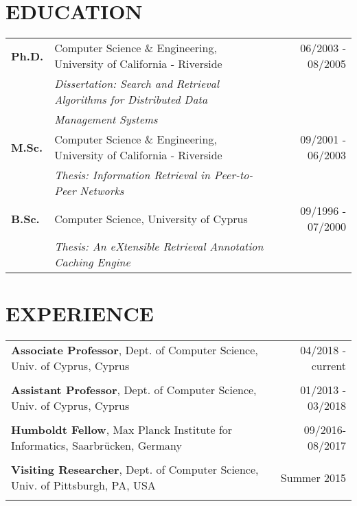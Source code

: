 \documentclass[10pt]{article}
\begin{document}
\begin{samepage}
\section{\bf EDUCATION}
\begin{center}  %
\begin{tabular*}{1.0\textwidth}%
   {@{\extracolsep{\fill}}llr}
{\bf Ph.D.}	& 	Computer Science \& Engineering, University of California - Riverside 		&       06/2003 - 08/2005 \\
		& 	{\em Dissertation: Search and Retrieval Algorithms for Distributed Data}		&			\\
        &  {\em Management Systems}  & \\
{\bf M.Sc.}	& 	Computer Science \& Engineering, University of California - Riverside 		& 	 09/2001 - 06/2003	\\
		& 	{\em Thesis: Information Retrieval in Peer-to-Peer Networks}	 		&			\\
{\bf B.Sc.}	& 	Computer Science, University of Cyprus			 		& 	 09/1996 - 07/2000		\\
		& 	{\em Thesis: An eXtensible Retrieval Annotation Caching Engine}	 		&			\\
\end{tabular*}
\end{center}



\section{\bf EXPERIENCE}

\begin{center} 
\begin{tabular*}{1.0\textwidth}%
   {@{\extracolsep{\fill}}lr}

{\bf Associate Professor}, Dept. of Computer Science, Univ. of Cyprus, Cyprus	&       04/2018 - current\\ \\

{\bf Assistant Professor}, Dept. of Computer Science, Univ. of Cyprus, Cyprus	&       01/2013 - 03/2018\\ \\

{\bf Humboldt Fellow},  Max Planck Institute for Informatics, Saarbr{\"u}cken, Germany 	&  	09/2016-08/2017  \\\\

{\bf Visiting Researcher},  Dept. of Computer Science, Univ. of Pittsburgh, PA, USA 	&  	Summer 2015  \\\\


\end{tabular*}
\end{center}
\end{samepage}
\end{document}
